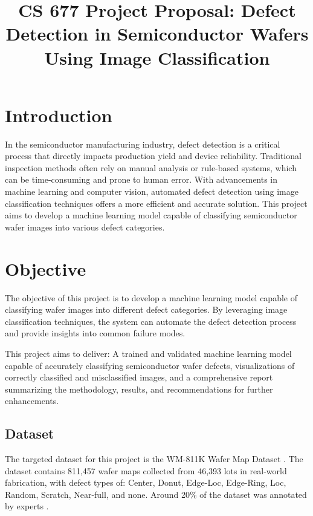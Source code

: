 \documentclass[conference]{IEEEtran}
\begin{document}
\title{
    CS 677 Project Proposal: Defect Detection in Semiconductor Wafers Using Image Classification
}

\author{
}

\maketitle

\section{Introduction}
In the semiconductor manufacturing industry, defect detection is a critical process that directly impacts production yield and device reliability. 
Traditional inspection methods often rely on manual analysis or rule-based systems, which can be time-consuming and prone to human error. 
With advancements in machine learning and computer vision, automated defect detection using image classification techniques offers a more efficient and accurate solution. 
This project aims to develop a machine learning model capable of classifying semiconductor wafer images into various defect categories.

\section{Objective}
The objective of this project is to develop a machine learning model capable of classifying wafer images into different defect categories. 
By leveraging image classification techniques, the system can automate the defect detection process and provide insights into common failure modes.

This project aims to deliver:
A trained and validated machine learning model capable of accurately classifying semiconductor wafer defects,
visualizations of correctly classified and misclassified images, and
a comprehensive report summarizing the methodology, results, and recommendations for further enhancements.

\subsection{Dataset} 
The targeted dataset for this project is the WM-811K Wafer Map Dataset \cite{b1}. 
The dataset contains 811,457 wafer maps collected from 46,393 lots in real-world fabrication, with defect types of: Center, Donut, Edge-Loc, Edge-Ring, Loc, Random, Scratch, Near-full, and none.
Around 20\% of the dataset was annotated by experts \cite{b2}.
\end{document}

